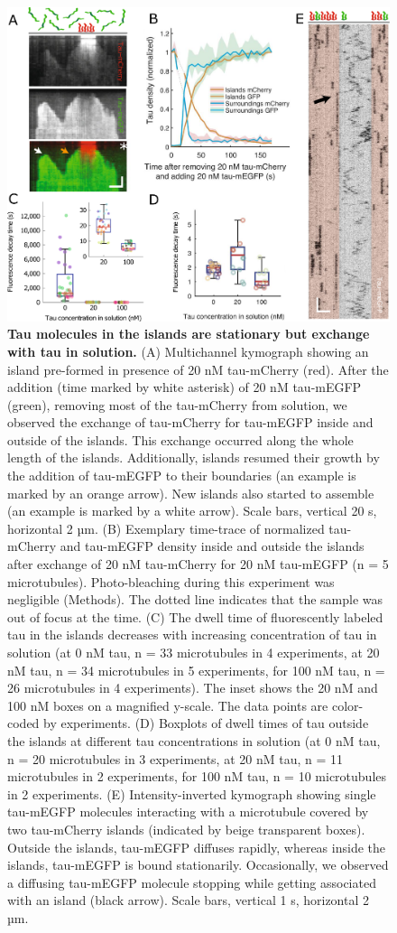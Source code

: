 \begin{figure}[h!]
\centering
\includegraphics[width=1\linewidth]{Figures/tau2.png}
\caption[Tau molecules in the islands are stationary but exchange with tau in solution.]{
\textbf{Tau molecules in the islands are stationary but exchange with tau in solution.} (A) Multichannel kymograph showing an island pre-formed in presence of 20 nM tau-mCherry (red). After the addition (time marked by white asterisk) of 20 nM tau-mEGFP (green), removing most of the tau-mCherry from solution, we observed the exchange of tau-mCherry for tau-mEGFP inside and outside of the islands. This exchange occurred along the whole length of the islands. Additionally, islands resumed their growth by the addition of tau-mEGFP to their boundaries (an example is marked by an orange arrow). New islands also started to assemble (an example is marked by a white arrow). Scale bars, vertical 20 s, horizontal 2 µm. (B) Exemplary time-trace of normalized tau-mCherry and tau-mEGFP density inside and outside the islands after exchange of 20 nM tau-mCherry for 20 nM tau-mEGFP (n = 5 microtubules). Photo-bleaching during this experiment was negligible (Methods). The dotted line indicates that the sample was out of focus at the time. (C) The dwell time of fluorescently labeled tau in the islands decreases with increasing concentration of tau in solution (at 0 nM tau, n = 33 microtubules in 4 experiments, at 20 nM tau, n = 34 microtubules in 5 experiments, for 100 nM tau, n = 26 microtubules in 4 experiments). The inset shows the 20 nM and 100 nM boxes on a magnified y-scale. The data points are color-coded by experiments. (D) Boxplots of dwell times of tau outside the islands at different tau concentrations in solution (at 0 nM tau, n = 20 microtubules in 3 experiments, at 20 nM tau, n = 11 microtubules in 2 experiments, for 100 nM tau, n = 10 microtubules in 2 experiments. (E) Intensity-inverted kymograph showing single tau-mEGFP molecules interacting with a microtubule covered by two tau-mCherry islands (indicated by beige transparent boxes). Outside the islands, tau-mEGFP diffuses rapidly, whereas inside the islands, tau-mEGFP is bound stationarily. Occasionally, we observed a diffusing tau-mEGFP molecule stopping while getting associated with an island (black arrow). Scale bars, vertical 1 s, horizontal 2 µm.
}
\end{figure}
